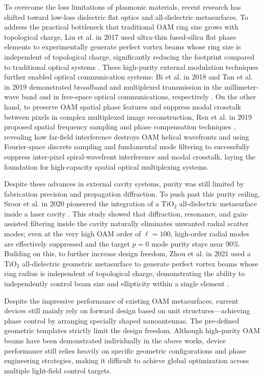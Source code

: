 To overcome the loss limitations of plasmonic materials, recent research has shifted toward low-loss dielectric flat optics and all-dielectric metasurfaces. To address the practical bottleneck that traditional OAM ring size grows with topological charge, Liu et al. in 2017 used ultra-thin fused-silica flat phase elements to experimentally generate perfect vortex beams whose ring size is independent of topological charge, significantly reducing the footprint compared to traditional optical systems \cite{liu2017generation}. These high-purity external modulation techniques further enabled optical communication systems: Bi et al. in 2018 and Tan et al. in 2019 demonstrated broadband and multiplexed transmission in the millimeter-wave band and in free-space optical communications, respectively \cite{bi2018metasurface, tan2019free}. On the other hand, to preserve OAM spatial phase features and suppress modal crosstalk between pixels in complex multiplexed image reconstruction, Ren et al. in 2019 proposed spatial frequency sampling and phase compensation techniques \cite{ren2019metasurface}, revealing how far-field interference destroys OAM helical wavefronts and using Fourier-space discrete sampling and fundamental mode filtering to successfully suppress inter-pixel spiral-wavefront interference and modal crosstalk, laying the foundation for high-capacity spatial optical multiplexing systems.

Despite these advances in external cavity systems, purity was still limited by fabrication precision and propagation diffraction. To push past this purity ceiling, Sroor et al. in 2020 pioneered the integration of a TiO$_2$ all-dielectric metasurface inside a laser cavity \cite{sroor2020high}. This study showed that diffraction, resonance, and gain-assisted filtering inside the cavity naturally eliminates unwanted radial scatter modes; even at the very high OAM order of $\ell=100$, high-order radial modes are effectively suppressed and the target $p=0$ mode purity stays near 90\%. Building on this, to further increase design freedom, Zhou et al. in 2021 used a TiO$_2$ all-dielectric geometric metasurface to generate perfect vortex beams whose ring radius is independent of topological charge, demonstrating the ability to independently control beam size and ellipticity within a single element \cite{zhou2021generation}.

Despite the impressive performance of existing OAM metasurfaces, current devices still mainly rely on forward design based on unit structures—achieving phase control by arranging specially shaped nanoantennas. The pre-defined geometric templates strictly limit the design freedom. Although high-purity OAM beams have been demonstrated individually in the above works, device performance still relies heavily on specific geometric configurations and phase engineering strategies, making it difficult to achieve global optimization across multiple light-field control targets.

